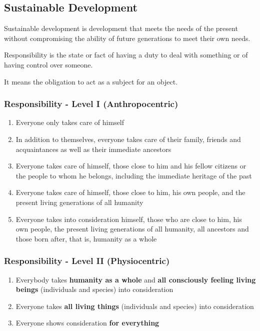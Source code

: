 \documentclass[11pt]{article}
\theoremstyle{definition}
\begin{document}
\subsection{Sustainable Development}
\begin{definition}
	Sustainable development is development that meets the needs of the present without compromising the ability of future generations to meet their own needs.
\end{definition}

\begin{definition}
	Responsibility is the state or fact of having a duty to deal with something or of having control over someone.
\end{definition}
It means the obligation to act as a subject for an object. \parencite{gobel2013unternehmensethik}

\subsubsection{Responsibility - Level I (Anthropocentric)}
\begin{enumerate}
	\item Everyone only takes care of himself
	\item In addition to themselves, everyone takes care of their family, friends and acquaintances as well as their immediate ancestors
	\item Everyone takes care of himself, those close to him and his fellow citizens or the people to whom he belongs, including the immediate heritage of the past
	\item Everyone takes care of himself, those close to him, his own people, and the present living generations of all humanity
	\item Everyone takes into consideration himself, those who are close to him, his own people, the present living generations of all humanity, all ancestors and those born after, that is, humanity as a whole
\end{enumerate}

\subsubsection{Responsibility - Level II (Physiocentric)}
\begin{enumerate}
	\item Everybody takes \textbf{humanity as a whole} and \textbf{all consciously feeling living beings} (individuals and species) into consideration
	\item Everyone takes \textbf{all living things} (individuals and species) into consideration
	\item Everyone shows consideration \textbf{for everything}
\end{enumerate}
\end{document}
